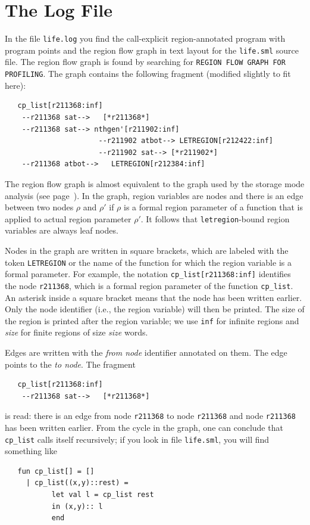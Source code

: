 \documentclass[12pt]{book}
\begin{document}
\section{The Log File}
In the file {\tt life.log} you find the call-explicit region-annotated
program with program points and the region flow graph in text layout
for the {\tt life.sml} source file.  The region flow graph is found by
searching for \texttt{REGION FLOW GRAPH FOR PROFILING}. The graph
contains the following fragment (modified slightly to fit here):\label{reg_flow_graph.ex}
\begin{verbatim}
   cp_list[r211368:inf]
    --r211368 sat-->   [*r211368*]
    --r211368 sat--> nthgen'[r211902:inf]   
                      --r211902 atbot--> LETREGION[r212422:inf]
                      --r211902 sat--> [*r211902*]
    --r211368 atbot-->   LETREGION[r212384:inf]
\end{verbatim}
The region flow graph is almost equivalent to the graph used by the
storage mode analysis (see page~\pageref{region flow graph}). In the
graph, region variables are nodes and there is an edge between two nodes
$\rho$ and $\rho'$ if $\rho$ is a formal region parameter of a
function that is applied to actual region parameter $\rho'$. It
follows that \texttt{letregion}-bound region variables are always leaf
nodes.

Nodes in the graph are written in square brackets, which are labeled
with the token {\tt LETREGION} or the name of the function for which
the region variable is a formal parameter. For example, the notation
\texttt{cp\_list[r211368:inf]} identifies the node \texttt{r211368},
which is a formal region parameter of the function \texttt{cp\_list}.
An asterisk inside a square bracket means that the node has been
written earlier.  Only the node identifier (i.e., the region variable)
will then be printed. The size of the region is printed after the
region variable; we use {\tt inf} for infinite regions and {\em
  size\/} for finite regions of size {\em size\/} words.

Edges are written with the {\em from node\/} identifier annotated on
them. The edge points to the \emph{to node}. The fragment
\begin{verbatim}
   cp_list[r211368:inf]
    --r211368 sat-->   [*r211368*]
\end{verbatim}
is read: there is an edge from node \texttt{r211368} to node
\texttt{r211368} and node \texttt{r211368} has been written earlier. From
the cycle in the graph, one can conclude that \texttt{cp\_list} calls
itself recursively; if you look in file {\tt life.sml}, you will
find something like
\begin{verbatim}
   fun cp_list[] = []
     | cp_list((x,y)::rest) = 
           let val l = cp_list rest
           in (x,y):: l
           end
\end{verbatim}
\end{document}
